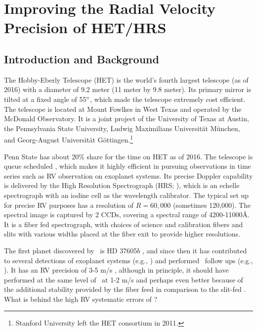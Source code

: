 \chapter{Improving the Radial Velocity Precision of
  HET/HRS}\label{chap:het} 


\section{Introduction and Background}

The Hobby-Eberly Telescope (HET) is the world's fourth largest
telescope (as of 2016) with a diameter of 9.2 meter (11 meter by 9.8
meter). Its primary mirror is tilted at a fixed angle of 55$^{\circ}$,
which made the telescope extremely cost efficient. The telescope is
located at Mount Fowlkes in West Texas and operated by the McDonald
Observatory. It is a joint project of the University of Texas at Austin, the
Pennsylvania State University, Ludwig Maximilians
Universit\"at M\"unchen, and Georg-August Universit\"at
G\"ottingen.\footnote{Stanford University left the HET consortium in 2011.}

Penn State has about 20\% share for the time on HET as of 2016. The
telescope is queue scheduled \citep{hetque2007}, which makes it
highly efficient in pursuing observations in time series such as RV
observation on exoplanet systems. Its precise Doppler capability is
delivered by the High Resolution Spectrograph (HRS;
\citealt{1998SPIE.3355..387T}), which is an echelle spectrograph with
an iodine cell as the wavelength calibrator. The typical set up for
precise RV purposes has a resolution of $R=60,000$ (sometimes
120,000). The spectral image is captured by 2 CCDs, covering a spectral
range of 4200-11000\AA. It is a fiber fed spectrograph, with choices
of science and calibration fibers and slits with various widths
placed at the fiber exit to provide higher resolutions.

The first planet discovered by \het\ is HD 37605$b$
\citep{cochran2004}, and since then it has contributed to several
detections of exoplanet systems (e.g.,
\citealt{2007ApJ...665.1407C,2009ApJS..182...97W,2016A&A...585A..73N})
and performed \kepler\ follow ups (e.g.,
\citealt{2014ApJ...795..151E}). It has an RV precision of 3-5 m/s
\citep{2009MNRAS.393..969B}, although in principle, it should have
performed at the same level of \keck\ at 1-2 m/s and perhaps even
better because of the additional stability provided by the fiber
feed in comparison to the slit-fed \keck. What is behind the high RV
systematic errors of \het? 

